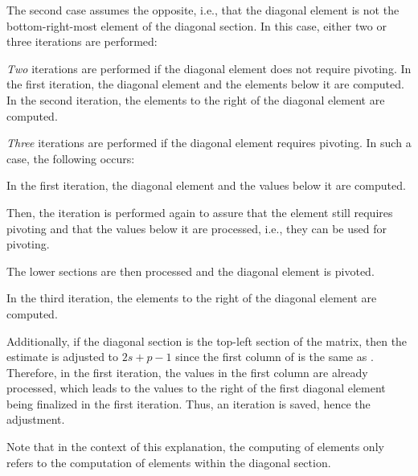 The second case assumes the opposite, i.e., that the diagonal element is not the bottom-right-most element of the diagonal section.
In this case, either two or three iterations are performed:
%
\begin{tight_itemize}
	\item \textit{Two} iterations are performed if the diagonal element does not require pivoting.
In the first iteration, the diagonal element and the elements below it are computed.
In the second iteration, the elements to the right of the diagonal element are computed.
	\item \textit{Three} iterations are performed if the diagonal element requires pivoting.
In such a case, the following occurs:
	\begin{tight_enumerate}
		\item In the first iteration, the diagonal element and the values below it are computed.
		\item Then, the iteration is performed again to assure that the element still requires pivoting and that the values below it are processed, i.e., they can be used for pivoting.
		\item The lower sections are then processed and the diagonal element is pivoted.
		\item In the third iteration, the elements to the right of the diagonal element are computed.
	\end{tight_enumerate}
\end{tight_itemize}

Additionally, if the diagonal section is the top-left section of the matrix, then the estimate is adjusted to $2s + p - 1$ since the first column of  is the same as .
Therefore, in the first iteration, the values in the first column are already processed, which leads to the values to the right of the first diagonal element being finalized in the first iteration.
Thus, an iteration is saved, hence the adjustment.

Note that in the context of this explanation, the computing of elements only refers to the computation of elements within the diagonal section.

